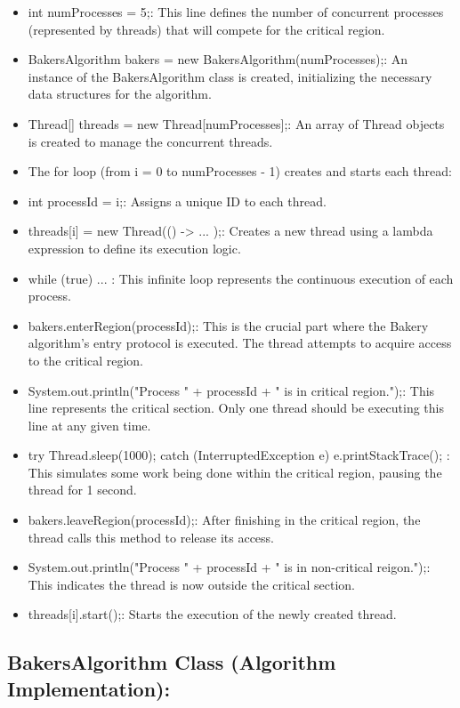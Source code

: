 \documentclass{report}
\begin{document}
\begin{itemize}

    \item int numProcesses = 5;: This line defines the number of concurrent processes (represented by threads) that will compete for the critical region.
    \item BakersAlgorithm bakers = new BakersAlgorithm(numProcesses);: An instance of the BakersAlgorithm class is created, initializing the necessary data structures for the algorithm.
    \item Thread[] threads = new Thread[numProcesses];: An array of Thread objects is created to manage the concurrent threads.
    \item The for loop (from i = 0 to numProcesses - 1) creates and starts each thread:
    \item int processId = i;: Assigns a unique ID to each thread.
    \item threads[i] = new Thread(() -> { ... });: Creates a new thread using a lambda expression to define its execution logic.
    \item while (true) { ... }: This infinite loop represents the continuous execution of each process.
    \item bakers.enterRegion(processId);: This is the crucial part where the Bakery algorithm's entry protocol is executed. The thread attempts to acquire access to the critical region.
    \item System.out.println("Process " + processId + " is in critical region.");: This line represents the critical section. Only one thread should be executing this line at any given time.
    \item try { Thread.sleep(1000); } catch (InterruptedException e) { e.printStackTrace(); }: This simulates some work being done within the critical region, pausing the thread for 1 second.
    \item bakers.leaveRegion(processId);: After finishing in the critical region, the thread calls this method to release its access.
    \item System.out.println("Process " + processId + " is in non-critical reigon.");: This indicates the thread is now outside the critical section.
    \item threads[i].start();: Starts the execution of the newly created thread.
  
\end{itemize}


\subsection{BakersAlgorithm Class (Algorithm Implementation):}
\end{document}
